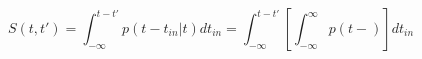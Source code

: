 \begin{equation}
S(t,t') = \int_{-\infty}^{t-t'} p(t-t_{in}|t) dt_{in} = \int_{-\infty}^{t-t'} \left[ \int_{-\infty}^\infty p(t-)\right] dt_{in}
\end{equation}